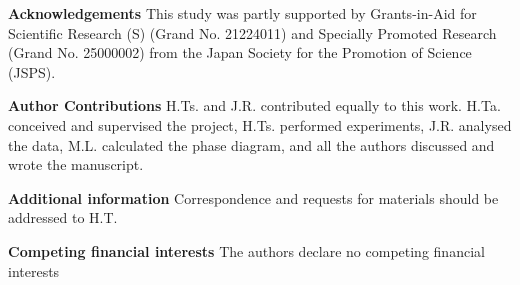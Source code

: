 \documentclass[preprint,amsmath,amssymb,superscriptaddress]{revtex4-1}
\begin{document}




\vspace{1cm}
\noindent
{\bf Acknowledgements} 
This study was partly supported by Grants-in-Aid for Scientific Research (S) (Grand No. 21224011) and Specially Promoted Research (Grand No. 25000002) from the Japan Society for the Promotion of Science (JSPS). 

\vspace{0.3cm}
\noindent
{\bf Author Contributions} 
H.Ts. and J.R. contributed equally to this work. 
H.Ta. conceived and supervised the project, H.Ts. performed experiments, J.R. analysed the data, M.L. calculated the phase diagram, and all the authors discussed and wrote the manuscript. 

\vspace{0.3cm}
\noindent
{\bf Additional information} 
Correspondence and requests for materials should be addressed to H.T. 

\vspace{0.3cm}
\noindent
{\bf Competing financial interests}
The authors declare no competing financial interests


\clearpage
\end{document}

